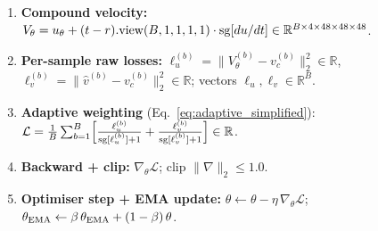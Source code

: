 \begin{enumerate}[nosep, leftmargin=2em]
  \item \textbf{Compound velocity:}
    $V_\theta = u_\theta + (t-r).\mathrm{view}(B,1,1,1,1) \cdot \operatorname{sg}[du/dt]
    \in \mathbb{R}^{B \times 4 \times 48 \times 48 \times 48}$.

  \item \textbf{Per-sample raw losses:}
    $\ell_u^{(b)} = \|V_\theta^{(b)} - v_c^{(b)}\|_2^2 \in \mathbb{R}$,
    $\ell_v^{(b)} = \|\hat{v}^{(b)} - v_c^{(b)}\|_2^2 \in \mathbb{R}$;
    vectors $\boldsymbol{\ell}_u, \boldsymbol{\ell}_v \in \mathbb{R}^B$.

  \item \textbf{Adaptive weighting} (Eq.~\ref{eq:adaptive_simplified}):
    $\mathcal{L} = \frac{1}{B}\sum_{b=1}^{B}\!\left[
      \frac{\ell_u^{(b)}}{\operatorname{sg}[\ell_u^{(b)}]+1}
      + \frac{\ell_v^{(b)}}{\operatorname{sg}[\ell_v^{(b)}]+1}
    \right] \in \mathbb{R}$.

  \item \textbf{Backward + clip:}
    $\nabla_\theta \mathcal{L}$; clip
    $\|\nabla\|_2 \le 1.0$.

  \item \textbf{Optimiser step + EMA update:}
    $\theta \leftarrow \theta - \eta\,\nabla_\theta \mathcal{L}$;
    $\theta_{\mathrm{EMA}} \leftarrow \beta\,\theta_{\mathrm{EMA}} + (1-\beta)\,\theta$.
\end{enumerate}
